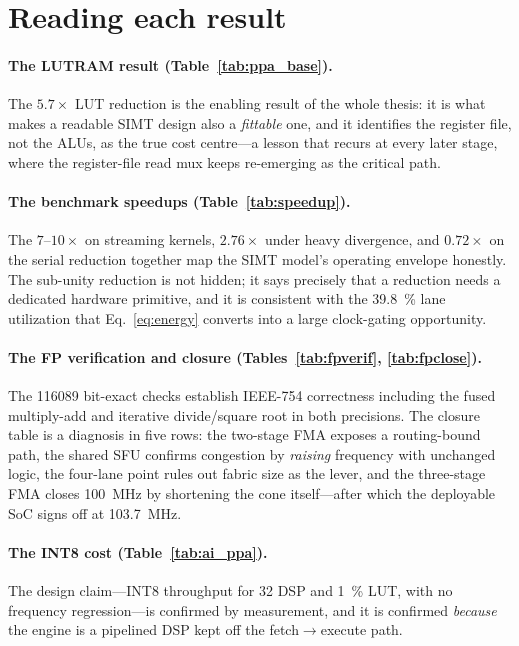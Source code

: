 \documentclass[12pt,a4paper,oneside]{report}
\begin{document}
\section{Reading each result}
\paragraph{The LUTRAM result (Table~\ref{tab:ppa_base}).} The $5.7\times$ LUT
reduction is the enabling result of the whole thesis: it is what makes a
readable SIMT design also a \emph{fittable} one, and it identifies the register
file, not the ALUs, as the true cost centre---a lesson that recurs at every later
stage, where the register-file read mux keeps re-emerging as the critical path.

\paragraph{The benchmark speedups (Table~\ref{tab:speedup}).} The $7$--$10\times$
on streaming kernels, $2.76\times$ under heavy divergence, and $0.72\times$ on the
serial reduction together map the SIMT model's operating envelope honestly. The
sub-unity reduction is not hidden; it says precisely that a reduction needs a
dedicated hardware primitive, and it is consistent with the \SI{39.8}{\percent}
lane utilization that Eq.~\eqref{eq:energy} converts into a large clock-gating
opportunity.

\paragraph{The FP verification and closure (Tables~\ref{tab:fpverif},
\ref{tab:fpclose}).} The \num{116089} bit-exact checks establish IEEE-754
correctness including the fused multiply-add and iterative divide/square root in
both precisions. The closure table is a diagnosis in five rows: the two-stage FMA
exposes a routing-bound path, the shared SFU confirms congestion by \emph{raising}
frequency with unchanged logic, the four-lane point rules out fabric size as the
lever, and the three-stage FMA closes \SI{100}{\mega\hertz} by shortening the cone
itself---after which the deployable SoC signs off at \SI{103.7}{\mega\hertz}.

\paragraph{The INT8 cost (Table~\ref{tab:ai_ppa}).} The design claim---INT8
throughput for \num{32} DSP and \SI{1}{\percent} LUT, with no frequency
regression---is confirmed by measurement, and it is confirmed \emph{because} the
engine is a pipelined DSP kept off the fetch$\rightarrow$execute path.
\end{document}
